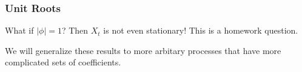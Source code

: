 \documentclass{beamer}
\begin{document}
\begin{frame}
\frametitle{Unit Roots}

What if $|\phi|=1$? Then $X_t$ is not even stationary! This is a homework question.
\newline

We will generalize these results to more arbitary processes that have more complicated sets of coefficients.


\end{frame}



% 
% 
% 
% 
% 
% 
% 
% 
% 
% 
% 
% 




\end{document}
